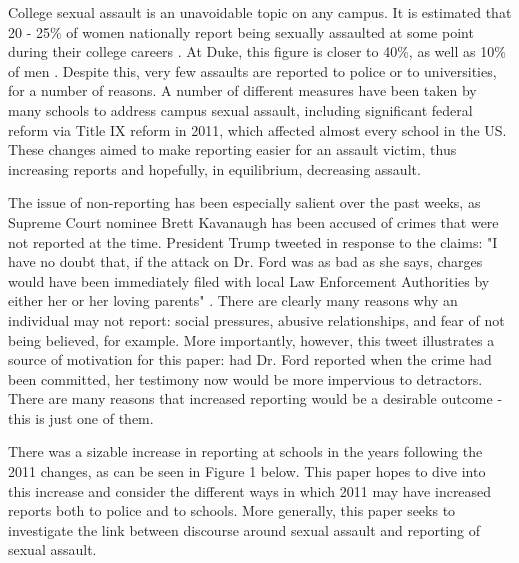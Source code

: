\documentclass[AER]{AEA}
\begin{document}

\clearpage
{}
College sexual assault is an unavoidable topic on any campus. It is estimated that 20 - 25\% of women nationally report being sexually assaulted at some point during their college careers \cite{fisher_sexual_2000}. At Duke, this figure is closer to 40\%, as well as 10\% of men \cite{fox_university_2017} . Despite this, very few assaults are reported to police or to universities, for a number of reasons. A number of different measures have been taken by many schools to address campus sexual assault, including significant federal reform via Title IX reform in 2011, which affected almost every school in the US. These changes aimed to make reporting easier for an assault victim, thus increasing reports and hopefully, in equilibrium, decreasing assault.

The issue of non-reporting has been especially salient over the past weeks, as Supreme Court nominee Brett Kavanaugh has been accused of crimes that were not reported at the time. President Trump tweeted in response to the claims: "I have no doubt that, if the attack on Dr. Ford was as bad as she says, charges would have been immediately filed with local Law Enforcement Authorities by either her or her loving parents" \citeyear{trump_i_2018}. There are clearly many reasons why an individual may not report: social pressures, abusive relationships, and fear of not being believed, for example. More importantly, however, this tweet illustrates a source of motivation for this paper: had Dr. Ford reported when the crime had been committed, her testimony now would be more impervious to detractors. There are many reasons that increased reporting would be a desirable outcome - this is just one of them. 

There was a sizable increase in reporting at schools in the years following the 2011 changes, as can be seen in Figure 1 below. This paper hopes to dive into this increase and consider the different ways in which 2011 may have increased reports both to police and to schools. More generally, this paper seeks to investigate the link between discourse around sexual assault and reporting of sexual assault. 
\end{document}
